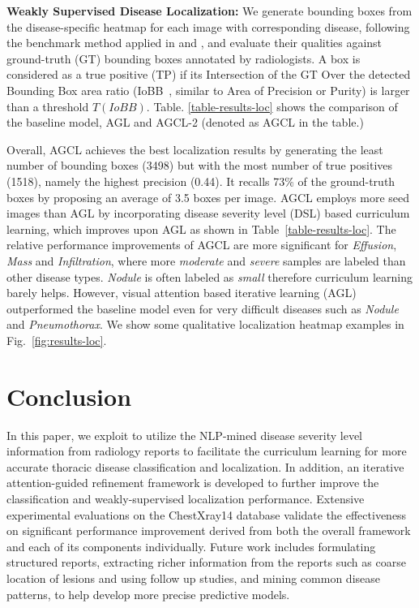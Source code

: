 \documentclass[runningheads,a4paper]{llncs}
\begin{document}
\textbf{Weakly Supervised Disease Localization:}
We generate bounding boxes from the disease-specific heatmap for each image with corresponding disease, following the benchmark method applied in \cite{Zhou_CVPR2016} and \cite{Wang_CVPR2017}, and evaluate their qualities against ground-truth (GT) bounding boxes annotated by radiologists. A  box is considered as a true positive (TP) if its Intersection of the GT Over the detected Bounding Box area ratio (IoBB~\cite{Wang_CVPR2017}, similar to Area of Precision or Purity) is larger than a threshold $T(IoBB)$. Table. \ref{table-results-loc} shows the comparison of the baseline model, AGL and AGCL-2 (denoted as AGCL in the table.)

Overall, AGCL achieves the best localization results by generating the least number of bounding boxes (3498) but with the most number of true positives (1518), namely the highest precision (0.44). It recalls 73\% of the ground-truth boxes by proposing an average of 3.5 boxes per image. AGCL employs more seed images than AGL by incorporating disease severity level (DSL) based curriculum learning, which improves upon AGL as shown in Table~\ref{table-results-loc}. The relative performance improvements of AGCL are more significant for \textit{Effusion}, \textit{Mass} and \textit{Infiltration}, where more \textit{moderate} and \textit{severe} samples are labeled than other disease types. \textit{Nodule} is often labeled as \textit{small} therefore curriculum learning barely helps. However, visual attention based iterative learning (AGL) outperformed the baseline model even for very difficult diseases such as \textit{Nodule} and \textit{Pneumothorax}. We show some qualitative localization heatmap examples in Fig.~\ref{fig:results-loc}.

\section{Conclusion}

In this paper, we exploit to utilize the NLP-mined disease severity level information from radiology reports to facilitate the curriculum learning for more accurate thoracic disease classification and localization. In addition, an iterative attention-guided refinement framework is developed to further improve the classification and weakly-supervised localization performance. Extensive experimental evaluations on the ChestXray14 database validate the effectiveness on significant performance improvement derived from both the overall framework and each of its components individually. Future work includes formulating structured reports, extracting richer information from the reports such as coarse location of lesions and using follow up studies, and mining common disease patterns, to help develop more precise predictive models. 
\end{document}
